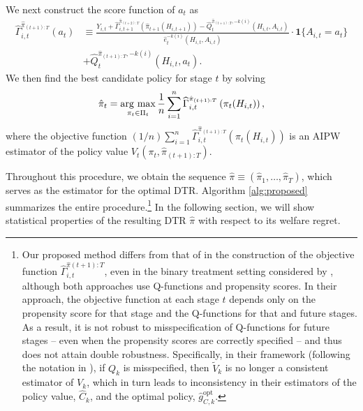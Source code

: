 We next construct the score function of $a_{t}$ as
\begin{align}
    \widehat{\Gamma}_{i,t}^{\hat{\pi}_{(t+1):T}}(a_t) &\equiv \frac{ Y_{i,t} + \widehat{\Gamma}_{i,t+1}^{\hat{\pi}_{(t+2):T}}(\hat{\pi}_{t+1}(H_{i,t+1})) - \widehat{Q}_{t}^{\hat{\pi}_{(t+1):T},-k(i)}(H_{i,t},A_{i,t}) }{\hat{e}_{t}^{-k(i)}(H_{i,t},A_{i,t})}\cdot \mathbf{1}\{A_{i,t} = a_t\} \nonumber \\
    &+ 
    \widehat{Q}_{t}^{\hat{\pi}_{(t+1):T},-k(i)}(H_{i,t},a_{t}). \label{eq:score_func_t}
\end{align}
We then find the best candidate policy for stage $t$ by solving
\begin{align*}
    \hat{\pi}_{t} = \argmax_{\pi_{t}\in \Pi_{t}} \frac{1}{n}\sum_{i=1}^{n} \widehat{\Gamma}_{i,t}^{\hat{\pi}_{(t+1):T}}\left(\pi_{t}(H_{i,t})\right), %
\end{align*}
where the objective function $(1/n)\sum_{i=1}^{n} \widehat{\Gamma}_{i,t}^{\hat{\pi}_{(t+1):T}}\left(\pi_{t}(H_{i,t})\right)$ is an AIPW estimator of the policy value $V_{t}(\pi_t,\hat{\pi}_{(t+1):T})$.

Throughout this procedure, we obtain the sequence $\hat{\pi} \equiv (\hat{\pi}_{1},\ldots,\hat{\pi}_{T})$, which serves as the estimator for the optimal DTR. Algorithm \ref{alg:proposed} summarizes the entire procedure.\footnote{\label{fn:zhang18c} Our proposed method differs from that of \cite{zhang2018c} in the construction of the objective function $\widehat{\Gamma}_{i,t}^{\hat{\pi}{(t+1):T}}$, even in the binary treatment setting considered by \cite{zhang2018c}, although both approaches use Q-functions and propensity scores. In their approach, the objective function at each stage $t$ depends only on the propensity score for that stage and the Q-functions for that and future stages. As a result, it is not robust to misspecification of Q-functions for future stages -- even when the propensity scores are correctly specified -- and thus does not attain double robustness. Specifically, in their framework (following the notation in \cite{zhang2018c}), if $Q_k$ is misspecified, then $\widetilde{V}_k$ is no longer a consistent estimator of $V_k$, which in turn leads to inconsistency in their estimators of the policy value, $\widehat{C}_k$, and the optimal policy, $\hat{g}_{C,k}^{\mathrm{opt}}$.} In the following section, we will show statistical properties of the resulting DTR $\hat{\pi}$ with respect to its welfare regret. \\


